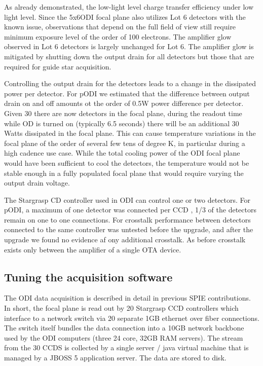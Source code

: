 \documentclass[]{spieman}
\begin{document}
As already demonstrated, the low-light level charge transfer efficiency under
low light level. Since the 5x6ODI focal plane also utilizes  Lot 6 detectors
with the known issue, observations that depend on the full field of view still
require minimum exposure level of the order of 100 electrons. The amplifier glow
observed in Lot 6 detectors is largely unchanged for Lot 6. The amplifier glow
is mitigated by shutting down the output drain for all detectors but those that
are required for guide star acquisition.


Controlling the output drain for the detectors leads to a change in the
dissipated power per detector. For pODI we estimated that the difference between
output drain on and off amounts ot the order of 0.5W power difference per
detector. Given 30 there are now detectors in the focal plane, during the
readout time while OD is turned on (typically 6.5 seconds) there will be an
additional 30 Watts dissipated in the focal plane. This can cause temperature
variations in the focal plane of the order of several  few tens of  degree K, in
particular during a high cadence use case. While the total cooling power of the
ODI focal plane would have been sufficient to cool the detectors, the
temperature would not be stable enough in a fully populated focal plane that
would require varying the output drain voltage.


The Stargrasp CD controller used in ODI can control one or two detectors. For
pODI, a maximum of one detector was connected per CCD , 1/3 of the detectors
remain on one to one connections.  For crosstalk performance between detectors
connected to the same controller was untested before the upgrade, and after the
upgrade we found no evidence af ony additional crosstalk. As before crosstalk
exists only between the amplifier of a single OTA device.



\subsection{Tuning the acquisition software}

The ODI data acquisition is described in detail in previous SPIE
 contributions\cite{Yeatts2008,Yeatts2010}.
In short, the focal plane is read out by 20 Stargrasp CCD controllers which
interface to a network switch via 20 separate 1GB ethernet over fiber
connections. The switch itself bundles the data connection into a 10GB network
backbone used by the ODI computers (three 24 core, 32GB RAM servers). The stream
from the 30 CCDS is collected by a single server / java virtual machine that is
managed by a JBOSS 5 application server. The data are stored to disk.
\end{document}
